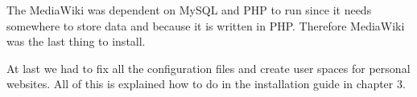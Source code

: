 The MediaWiki was dependent on MySQL and PHP to run since it needs somewhere to store data and because it is written in PHP. Therefore MediaWiki was the last thing to install. 

At last we had to fix all the configuration files and create user spaces for personal websites. All of this is explained how to do in the installation guide in chapter 3.